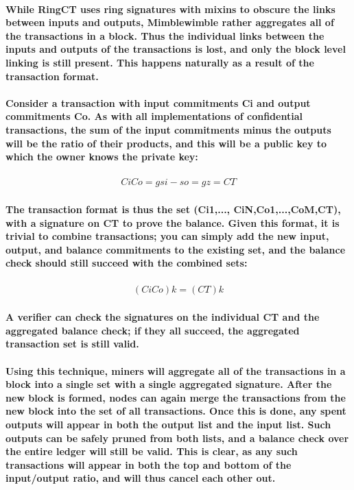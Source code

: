 \documentclass{article}
\begin{document}
\paragraph{While RingCT uses ring signatures with mixins to obscure the links between inputs and outputs, Mimblewimble rather aggregates all of the transactions in a block.  Thus the individual links between the inputs and outputs of the transactions is lost, and only the block level linking is still present.  This happens naturally as a result of the transaction format.}

\paragraph{Consider a transaction with input commitments Ci and output commitments Co.  As with all implementations of confidential transactions, the sum of the input commitments minus the outputs will be the ratio of their products, and this will be a public key to which the owner knows the private key:}

\begin{eqnarray}
  Ci Co=g si -  so=gz=CT
\end{eqnarray}

\paragraph{The transaction format is thus the set (Ci1,..., CiN,Co1,...,CoM,CT), with a signature on CT to prove the balance.  Given this format, it is trivial to combine transactions; you can simply add the new input, output, and balance commitments to the existing set, and the balance check should still succeed with the combined sets:}

\begin{eqnarray}
  (  Ci Co)k= (CT)k
\end{eqnarray}

\paragraph{A verifier can check the signatures on the individual CT and the aggregated balance check; if they all succeed, the aggregated transaction set is still valid.}

\paragraph{Using this technique, miners will aggregate all of the transactions in a block into a single set with a single aggregated signature.  After the new block is formed, nodes can again merge the transactions from the new block into the set of all transactions.  Once this is done, any spent outputs will appear in both the output list and the input list.  Such outputs can be safely pruned from both lists, and a balance check over the entire ledger will still be valid.  This is clear, as any such transactions will appear in both the top and bottom of the input/output ratio, and will thus cancel each other out.  }
\end{document}
